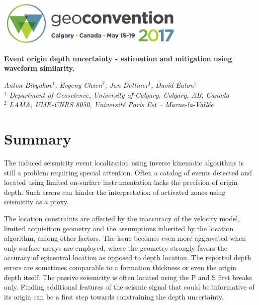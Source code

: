 \documentclass[letterpaper,11pt]{article}
\begin{document}

\begin{center}
\includegraphics[width=9.22cm]{header.png} \vspace{-1pt}
\end{center}

\begin{flushleft}
{\LARGE
\begin{spacing}{0.9}
\textbf{Event origin depth uncertainty - estimation and mitigation using waveform similarity.}
\end{spacing}
}

\textit{Anton Biryukov${}^1$, Evgeny Chzen${}^2$, Jan Dettmer${}^1$, David Eaton${}^1$} \\
\textit{${}^1$ Department of Geoscience, University of Calgary, Calgary, AB, Canada} \\
\textit{${}^2$ LAMA, UMR-CNRS 8050, Universit\'{e} Paris Est -- Marne-la-Vall\'{e}e}
\end{flushleft}

\section*{Summary}
%
The induced seismicity event localization using inverse kinematic algorithms is still a problem requiring special attention. Often a catalog of events detected and located using limited on-surface instrumentation lacks the precision of origin depth. Such errors can hinder the interpretation of activated zones using seismicity as a proxy.

The location constraints are affected by the inaccuracy of the velocity model, limited acquisition geometry and the assumptions inherited by the location algorithm, among other factors. The issue becomes even more aggravated when only surface arrays are employed, where the geometry strongly favors the accuracy of epicentral location as opposed to depth location. The reported depth errors are sometimes comparable to a formation thickness or even the origin depth itself. The passive seismicity is often located using the P and S first breaks only. Finding additional features of the seismic signal that could be informative of its origin can be a first step towards constraining the depth uncertainty. 
\end{document}

